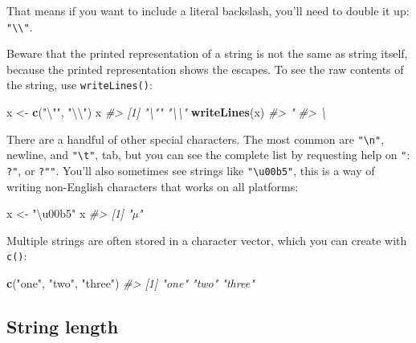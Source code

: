 \documentclass[]{book}
\newenvironment{Shaded}{\begin{snugshade}}{\end{snugshade}}
\newcommand{\CharTok}[1]{\textcolor[rgb]{0.31,0.60,0.02}{#1}}
\newcommand{\CommentTok}[1]{\textcolor[rgb]{0.56,0.35,0.01}{\textit{#1}}}
\newcommand{\KeywordTok}[1]{\textcolor[rgb]{0.13,0.29,0.53}{\textbf{#1}}}
\newcommand{\NormalTok}[1]{#1}
\newcommand{\StringTok}[1]{\textcolor[rgb]{0.31,0.60,0.02}{#1}}
\begin{document}
That means if you want to include a literal backslash, you'll need to double it up: \texttt{"\textbackslash{}\textbackslash{}"}.

Beware that the printed representation of a string is not the same as string itself, because the printed representation shows the escapes. To see the raw contents of the string, use \texttt{writeLines()}:

\begin{Shaded}
\begin{Highlighting}[]
\NormalTok{x <-}\StringTok{ }\KeywordTok{c}\NormalTok{(}\StringTok{"}\CharTok{\textbackslash{}"}\StringTok{"}\NormalTok{, }\StringTok{"}\CharTok{\textbackslash{}\textbackslash{}}\StringTok{"}\NormalTok{)}
\NormalTok{x}
\CommentTok{#> [1] "\textbackslash{}"" "\textbackslash{}\textbackslash{}"}
\KeywordTok{writeLines}\NormalTok{(x)}
\CommentTok{#> "}
\CommentTok{#> \textbackslash{}}
\end{Highlighting}
\end{Shaded}

There are a handful of other special characters. The most common are \texttt{"\textbackslash{}n"}, newline, and \texttt{"\textbackslash{}t"}, tab, but you can see the complete list by requesting help on \texttt{"}: \texttt{?\textquotesingle{}"\textquotesingle{}}, or \texttt{?"\textquotesingle{}"}. You'll also sometimes see strings like \texttt{"\textbackslash{}u00b5"}, this is a way of writing non-English characters that works on all platforms:

\begin{Shaded}
\begin{Highlighting}[]
\NormalTok{x <-}\StringTok{ "\textbackslash{}u00b5"}
\NormalTok{x}
\CommentTok{#> [1] "µ"}
\end{Highlighting}
\end{Shaded}

Multiple strings are often stored in a character vector, which you can create with \texttt{c()}:

\begin{Shaded}
\begin{Highlighting}[]
\KeywordTok{c}\NormalTok{(}\StringTok{"one"}\NormalTok{, }\StringTok{"two"}\NormalTok{, }\StringTok{"three"}\NormalTok{)}
\CommentTok{#> [1] "one"   "two"   "three"}
\end{Highlighting}
\end{Shaded}

\hypertarget{string-length}{%
\subsection{String length}\label{string-length}}
\end{document}
